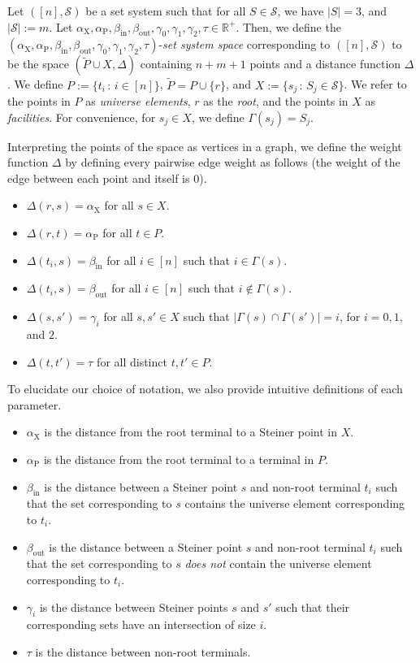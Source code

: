 \documentclass{theoretics}
\newcommand{\R}{\mathbb{R}}
\newcommand{\1}{\textbf{1}}
\newcommand{\td}{\tau}
\newcommand{\srd}{\alpha_{\text{X}}}
\newcommand{\trd}{\alpha_{\text{P}}}
\renewcommand{\tilde}{\widetilde}
\begin{document}
\begin{definition} \label{defn: set system space}
Let $([n], \mathcal{S})$ be a set system such that for all $S \in \mathcal{S}$, we have $|S| = 3$, and $|\mathcal{S}|:= m$. Let $\srd, \trd, \beta_{\text{in}}, \beta_{\text{out}}, \gamma_0, \gamma_1, \gamma_2, \td \in \R^+$. 
Then, we define the $(\srd, \trd, \beta_{\text{in}}, \beta_{\text{out}}, \gamma_0, \gamma_1, \gamma_2, \td)$-\textit{set system space} corresponding to $([n], \mathcal{S})$ to be the space  $(\tilde{P} \cup X, \Delta)$ containing $n + m + 1$ points and a distance function $\Delta$. We define $P := \{t_i \,:\, i \in [n]\}$, $\tilde{P} = P \cup \{r\}$, and $X := \{s_j \,:\, S_j \in \mathcal{S}\}$. We refer to the points in $P$ as \textit{universe elements}, $r$ as the \textit{root}, and the points in $X$ as \textit{facilities}. For convenience, for $s_j \in X$, we define $\Gamma(s_j) = S_j$.

Interpreting the points of the space as vertices in a graph, we define the weight function $\Delta$ by defining every pairwise edge weight as follows (the weight of the edge between each point and itself is $0$).
\begin{itemize}
    \item $\Delta(r, s) = \srd$ for all $s \in X$.
    \item $\Delta(r,t) = \trd $ for all $t \in P$.
    \item $\Delta(t_i, s) = \beta_{\text{in}}$ for all $i \in [n]$ such that $i \in \Gamma(s)$.
    \item $\Delta (t_i, s) = \beta_{\text{out}} $ for all $i \in [n]$ such that $i \not\in \Gamma(s)$.
    \item $\Delta(s, s') = \gamma_i$ for all $s, s' \in X$ such that $|\Gamma(s) \cap \Gamma(s')| = i$, for $i = 0,1,$ and $2$.
    \item $\Delta(t,t') = \td$ for all distinct $t,t' \in P$.
\end{itemize}
\end{definition}

To elucidate our choice of notation, we also provide intuitive definitions of each parameter. 
\begin{itemize}
\item $\srd$ is the distance from the root terminal to a Steiner point in $X$.
    \item $\trd$ is the distance from the root terminal to a terminal in $P$.
    \item $\beta_{\text{in}}$ is the distance between a Steiner point $s$ and non-root terminal $t_i$ such that the set corresponding to $s$ contains the universe element corresponding to $t_i$. 
    \item $\beta_{\text{out}}$ is the distance between a Steiner point $s$ and non-root terminal $t_i$ such that the set corresponding to $s$ \textit{does not} contain the universe element corresponding to $t_i$.
    \item $\gamma_i$ is the distance between Steiner points $s$ and $s'$ such that their corresponding sets have an intersection of size $i$.
    \item $\tau$ is the distance between non-root terminals.
\end{itemize}
\end{document}
